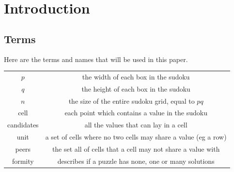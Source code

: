 
\section{Introduction}

\subsection{Terms}
Here are the terms and names that will be used in this paper.
\begin{center}\begin{tabular}{c||c}
    \hline
    $p$         &   the width of each box in the sudoku                             \\
    $q$         &   the height of each box in the sudoku                            \\
    $n$         &   the size of the entire sudoku grid, equal to $pq$               \\
    cell        &   each point which contains a value in the sudoku                 \\
    candidates  &   all the values that can lay in a cell                           \\
    unit        &   a set of cells where no two cells may share a value (eg a row)  \\
    peers       &   the set all of cells that a cell may not share a value with     \\
    formity     &   describes if a puzzle has none, one or many solutions           \\
    \hline
\end{tabular}\end{center}

